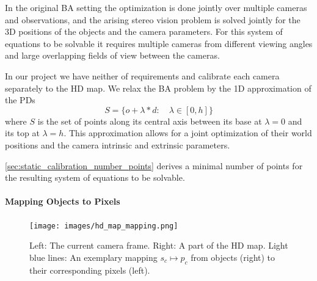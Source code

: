In the original BA setting the optimization is done jointly over multiple cameras and observations, and the arising stereo vision problem is solved jointly for the 3D positions of the objects and the camera parameters.
For this system of equations to be solvable it requires multiple cameras from different viewing angles and large overlapping fields of view between the cameras.

In our project we have neither of requirements and calibrate each camera separately to the HD map.
We relax the BA problem by the 1D approximation of the PDs
\begin{equation}
S = \{o + \lambda * d: \quad \lambda \in [0, h]\}
\end{equation}
where $S$ is the set of points along its central axis between its base at $\lambda = 0$ and its top at $\lambda = h$.
This approximation allows for a joint optimization of their world positions and the camera intrinsic and extrinsic parameters.

\autoref{sec:static_calibration_number_points} derives a minimal number of points for the resulting system of equations to be solvable.




\paragraph{Mapping Objects to Pixels}
\begin{figure}[t]
  \begin{center}
     \texttt{[image: images/hd\_map\_mapping.png]}
  \end{center}
     \caption{
       Left: The current camera frame. 
       Right: A part of the HD map.
       Light blue lines: An exemplary mapping $s_c \mapsto p_c$ from objects (right) to their corresponding pixels (left).
       }
  \label{fig:static_calibration_mapping}
  \end{figure}

